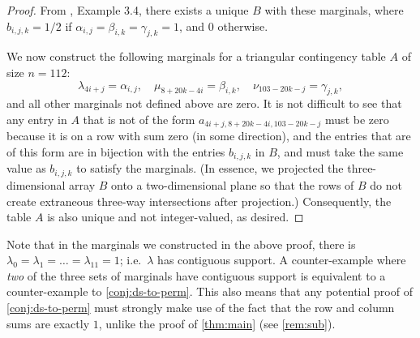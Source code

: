 \documentclass[letterpaper,reqno,11pt]{amsart}
\begin{document}
\begin{proof}
    From \cite{LK2013}, Example 3.4, there exists a unique $B$ with these marginals, where $b_{i, j, k} = 1/2$ if $\alpha_{i,j}=\beta_{i,k}=\gamma_{j,k}=1$, and $0$ otherwise.

    We now construct the following marginals for a triangular contingency table $A$ of size $n = 112$: \[\lambda_{4i+j}=\alpha_{i,j},\quad \mu_{8+20k-4i}=\beta_{i,k},\quad \nu_{103-20k-j}=\gamma_{j,k},\] and all other marginals not defined above are zero. It is not difficult to see that any entry in $A$ that is not of the form $a_{4i+j, 8+20k-4i, 103-20k-j}$ must be zero because it is on a row with sum zero (in some direction), and the entries that are of this form are in bijection with the entries $b_{i,j,k}$ in $B$, and must take the same value as $b_{i,j,k}$ to satisfy the marginals. (In essence, we projected the three-dimensional array $B$ onto a two-dimensional plane so that the rows of $B$ do not create extraneous three-way intersections after projection.) Consequently, the table $A$ is also unique and not integer-valued, as desired.
\end{proof}

Note that in the marginals we constructed in the above proof, there is $\lambda_{0} = \lambda_1 = \dots = \lambda_{11} = 1$; i.e.\ $\lambda$ has contiguous support. A counter-example where \emph{two} of the three sets of marginals have contiguous support is equivalent to a counter-example to \cref{conj:ds-to-perm}. This also means that any potential proof of \cref{conj:ds-to-perm} must strongly make use of the fact that the row and column sums are exactly $1$, unlike the proof of \cref{thm:main} (see \cref{rem:sub}). 
\end{document}
